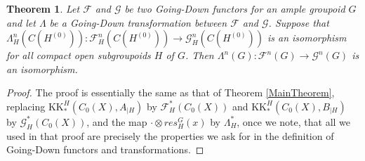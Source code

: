 \documentclass[reqno,oneside,a4paper,11pt]{amsart}
\theoremstyle{theorem}
\newtheorem{satz}{Theorem}[section]
\theoremstyle{definition}
\begin{document}
	\begin{satz}\label{Theorem:Going-Down Theorem}
		Let $\mathcal{F}$ and $\mathcal{G}$ be two Going-Down functors for an ample groupoid $G$ and let $\Lambda$ be a Going-Down transformation between $\mathcal{F}$ and $\mathcal{G}$. Suppose that $\Lambda_H^n(C(H^{(0)})):\mathcal{F}_H^n(C(H^{(0)}))\rightarrow\mathcal{G}_H^n(C(H^{(0)}))$ is an isomorphism for all compact open subgroupoids $H$ of $G$. Then $\Lambda^n(G):\mathcal{F}^n(G)\rightarrow\mathcal{G}^n(G)$ is an isomorphism.
	\end{satz}
	\begin{proof} The proof is essentially the same as that of Theorem \ref{MainTheorem}, replacing $\mathrm{KK}^H_*(C_0(X),A_{\mid H})$ by $\mathcal{F}^*_H(C_0(X))$ and $\mathrm{KK}^H_*(C_0(X),B_{\mid H})$ by $\mathcal{G}^*_H(C_0(X))$, and the map $\cdot \otimes res_H^G(x)$ by $\Lambda_H^*$, once we note, that all we used in that proof are precisely the properties we ask for in the definition of Going-Down functors and transformations.
	\end{proof}
	
	
\end{document}
